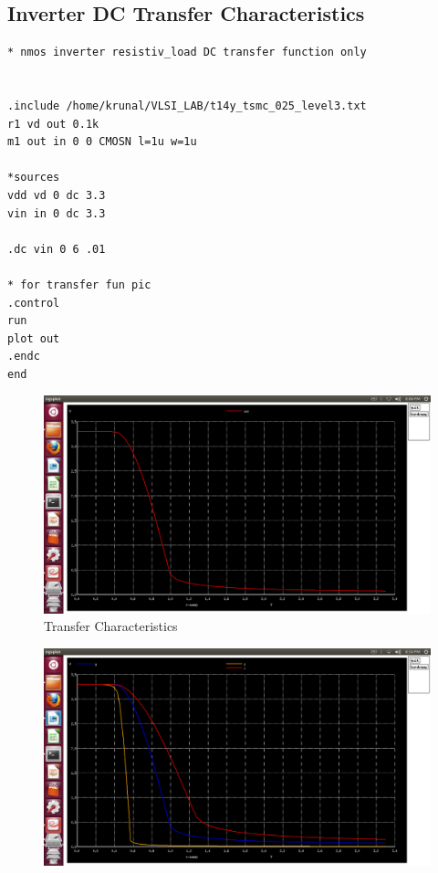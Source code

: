 \documentclass[12pt,a4paper]{article}
\begin{document}
\begin{center}
\subsection{Inverter DC Transfer Characteristics}
\vspace{5pt}
\begin{lstlisting}
* nmos inverter resistiv_load DC transfer function only


.include /home/krunal/VLSI_LAB/t14y_tsmc_025_level3.txt
r1 vd out 0.1k
m1 out in 0 0 CMOSN l=1u w=1u

*sources
vdd vd 0 dc 3.3 
vin in 0 dc 3.3

.dc vin 0 6 .01

* for transfer fun pic
.control
run
plot out
.endc
end
\end{lstlisting}
\begin{figure}[!ht]
\centering
\includegraphics[scale=0.37]{lab2_lab21_transfer_char.png}

\caption[Short]{Transfer Characteristics}
\end{figure}






\begin{figure}[!ht]
\centering
\includegraphics[scale=0.37]{lab2_lab22_varing_w_n.png}


\end{figure}
\end{center}
\end{document}
